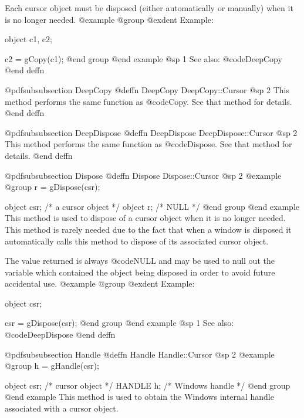 Each cursor object must be disposed (either automatically or manually)
when it is no longer needed.
@example
@group
@exdent Example:

object  c1, c2;

c2 = gCopy(c1);
@end group
@end example
@sp 1
See also:  @code{DeepCopy}
@end deffn










@pdfsubsubsection {DeepCopy}
@deffn {DeepCopy} DeepCopy::Cursor
@sp 2
This method performs the same function as @code{Copy}.  See that
method for details.
@end deffn










@pdfsubsubsection {DeepDispose}
@deffn {DeepDispose} DeepDispose::Cursor
@sp 2
This method performs the same function as @code{Dispose}.  See that
method for details.
@end deffn







@pdfsubsubsection {Dispose}
@deffn {Dispose} Dispose::Cursor
@sp 2
@example
@group
r = gDispose(csr);

object  csr;   /*  a cursor object    */
object  r;     /*  NULL               */
@end group
@end example
This method is used to dispose of a cursor object when it
is no longer needed.  This method is rarely needed due to the fact that
when a window is disposed it automatically calls this method to
dispose of its associated cursor object.

The value returned is always @code{NULL} and may be used to null out
the variable which contained the object being disposed in order to
avoid future accidental use.
@example
@group
@exdent Example:

object  csr;

csr = gDispose(csr);
@end group
@end example
@sp 1
See also:  @code{DeepDispose}
@end deffn










@pdfsubsubsection {Handle}
@deffn {Handle} Handle::Cursor
@sp 2
@example
@group
h = gHandle(csr);

object  csr;    /*  cursor object   */
HANDLE  h;      /*  Windows handle  */
@end group
@end example
This method is used to obtain the Windows internal handle associated with
a cursor object.  

